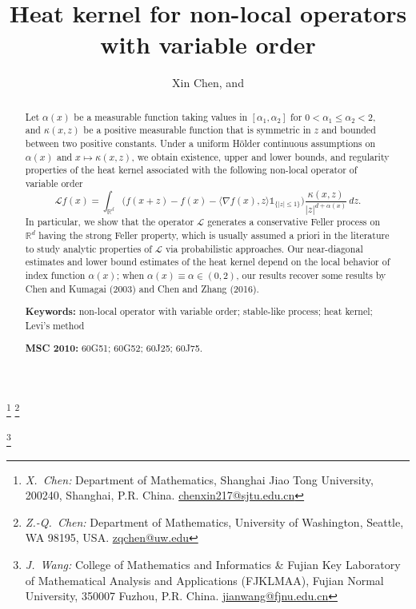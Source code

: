 \documentclass[a4paper,11pt]{amsart}
\renewcommand{\le}{\leqslant}
\newcommand{\R}{\mathds R}
\newcommand{\I}{\mathds 1}
\newcommand{\A}{\alpha}
\def\LL{{\mathcal L}}
\theoremstyle{definition}
\begin{document}
\allowdisplaybreaks
\title[Heat kernel for non-local operators with variable order]{
Heat kernel for non-local operators with variable order}

\author{{Xin Chen},  \quad \hbox{and} }
\thanks{\emph{X.\ Chen:}
   Department of Mathematics, Shanghai Jiao Tong University, 200240, Shanghai, P.R. China. \url{chenxin217@sjtu.edu.cn}}
  \thanks{\emph{Z.-Q.\ Chen:}
   Department of Mathematics, University of Washington, Seattle,
WA 98195, USA. \url{zqchen@uw.edu}}

  \thanks{\emph{J.\ Wang:}
 College of Mathematics and Informatics \& Fujian Key Laboratory of Mathematical Analysis and Applications (FJKLMAA), Fujian Normal University, 350007 Fuzhou, P.R. China. \url{jianwang@fjnu.edu.cn}}


\maketitle


\begin{abstract} Let $\alpha(x)$ be a measurable function taking values in  $ [\alpha_1,\alpha_2]$ for  $0<\A_1\le \A_2<2$, and
$\kappa(x,z)$ be a positive measurable function that is symmetric in $z$ and bounded
between two positive constants.  Under  a uniform H\"{o}lder continuous assumptions on
$\alpha(x)$ and $x\mapsto \kappa(x,z)$, we obtain  existence, upper and
lower bounds, and regularity properties of the heat kernel associated
with the following non-local operator of variable order
$$
\LL f(x)=\int_{\R^d}\big(f(x+z)-f(x)-\langle\nabla f(x), z\rangle \I_{\{|z|\le
1\}}\big) \frac{\kappa(x,z)}{|z|^{d+\alpha(x)}}\,dz.
$$
In particular, we  show
that the operator $\LL$   generates a conservative Feller process on $\R^d$ having the strong Feller property,
which is usually assumed a priori  in the literature
to study analytic properties of $\LL$ via probabilistic approaches.  Our near-diagonal
estimates and lower bound estimates of the heat kernel depend on the local behavior of index function $\alpha(x)$; when
$\alpha(x)\equiv \A\in(0,2)$, our results recover  some results
 by Chen and Kumagai (2003) and Chen and Zhang (2016).

\medskip

\noindent\textbf{Keywords:} non-local operator with variable order; stable-like process; heat kernel; Levi's method

\medskip

\noindent \textbf{MSC 2010:} 60G51; 60G52; 60J25; 60J75.
\end{abstract}
\end{document}

